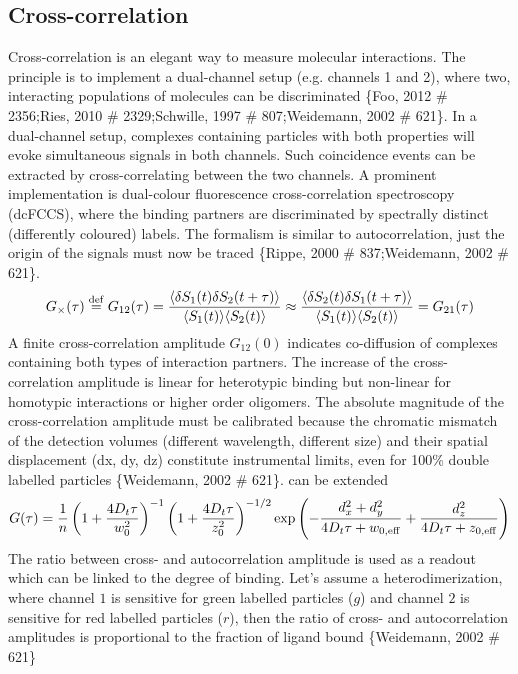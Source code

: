 \subsection{Cross-correlation}
\label{sec:theor.cross}
Cross-correlation is an elegant way to measure molecular interactions. The principle is to implement a dual-channel setup (e.g. channels 1 and 2), where two, interacting populations of molecules can be discriminated \{Foo, 2012 \# 2356;Ries, 2010 \# 2329;Schwille, 1997 \# 807;Weidemann, 2002 \# 621\}. In a dual-channel setup, complexes containing particles with both properties will evoke simultaneous signals in both channels. Such coincidence events can be extracted by cross-correlating between the two channels. A prominent implementation is dual-colour fluorescence cross-correlation spectroscopy (dcFCCS), where the binding partners are discriminated by spectrally distinct (differently coloured) labels. The formalism is similar to autocorrelation, just the origin of the signals must now be traced \{Rippe, 2000 \# 837;Weidemann, 2002 \# 621\}.
	\begin{equation}
	\label{eq19}
	G_\times (\tau) \stackrel{\rm def}{=} G_{12} (\tau) = \frac{\langle \delta S_1(t) \delta S_2(t+\tau)\rangle}{\langle S_1(t) \rangle \langle S_2(t) \rangle} \approx \frac{\langle \delta S_2(t) \delta S_1(t+\tau)\rangle}{\langle S_1(t) \rangle \langle S_2(t) \rangle} =  G_{21} (\tau)
	\end{equation}
A finite cross-correlation amplitude $G_{12}(0)$ indicates co-diffusion of complexes containing both types of interaction partners. The increase of the cross-correlation amplitude is linear for heterotypic binding but non-linear for homotypic interactions or higher order oligomers. The absolute magnitude of the cross-correlation amplitude must be calibrated because the chromatic mismatch of the detection volumes (different wavelength, different size) and their spatial displacement (dx, dy, dz) constitute instrumental limits, even for 100\% double labelled particles \{Weidemann, 2002 \# 621\}.  can be extended
	\begin{equation}
	\label{eq20}
	G(\tau) = \frac{1}{n} \left(1+\frac{4 D_t \tau}{w_0^2} \right) ^{-1} \left(1+\frac{4D_t \tau}{z_0^2} \right)^{-1/2} \exp \left(- \frac{d_x^2 + d_y^2}{4 D_t \tau + w_{0,\rm eff}} + \frac{d_z^2}{4 D_t \tau + z_{0,\rm eff}} \right)
	\end{equation}
The ratio between cross- and autocorrelation amplitude is used as a readout which can be linked to the degree of binding. Let's assume a heterodimerization, where channel $1$ is sensitive for green labelled particles ($g$) and channel $2$ is sensitive for red labelled particles ($r$), then the ratio of cross- and autocorrelation amplitudes is proportional to the fraction of ligand bound \{Weidemann, 2002 \# 621\}
